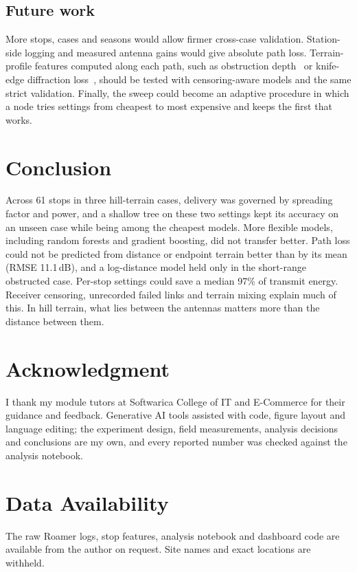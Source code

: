 \documentclass[conference]{IEEEtran}
\newcommand{\dB}{\,dB\xspace}
\begin{document}
\subsection{Future work}
More stops, cases and seasons would allow firmer cross-case validation. Station-side logging and measured antenna gains would give absolute path loss. Terrain-profile features computed along each path, such as obstruction depth~\cite{ethier2024} or knife-edge diffraction loss~\cite{itu_p526}, should be tested with censoring-aware models and the same strict validation. Finally, the sweep could become an adaptive procedure in which a node tries settings from cheapest to most expensive and keeps the first that works.

\section{Conclusion}\label{sec:conclusion}
Across 61 stops in three hill-terrain cases, delivery was governed by spreading factor and power, and a shallow tree on these two settings kept its accuracy on an unseen case while being among the cheapest models. More flexible models, including random forests and gradient boosting, did not transfer better. Path loss could not be predicted from distance or endpoint terrain better than by its mean (RMSE 11.1\dB), and a log-distance model held only in the short-range obstructed case. Per-stop settings could save a median 97\% of transmit energy. Receiver censoring, unrecorded failed links and terrain mixing explain much of this. In hill terrain, what lies between the antennas matters more than the distance between them.

\section*{Acknowledgment}
I thank my module tutors at Softwarica College of IT and E-Commerce for their guidance and feedback. Generative AI tools assisted with code, figure layout and language editing; the experiment design, field measurements, analysis decisions and conclusions are my own, and every reported number was checked against the analysis notebook.

\section*{Data Availability}
The raw Roamer logs, stop features, analysis notebook and dashboard code are available from the author on request. Site names and exact locations are withheld.
\end{document}

